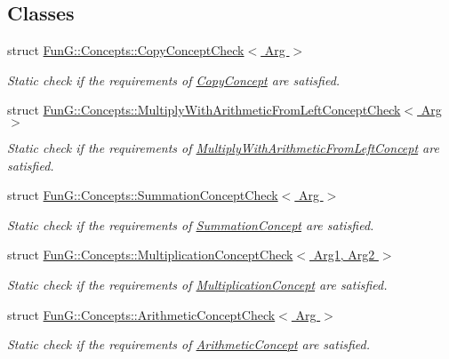 \subsection*{Classes}
\begin{DoxyCompactItemize}
\item 
struct \hyperlink{structFunG_1_1Concepts_1_1CopyConceptCheck}{Fun\+G\+::\+Concepts\+::\+Copy\+Concept\+Check$<$ Arg $>$}
\begin{DoxyCompactList}\small\item\em Static check if the requirements of \hyperlink{structFunG_1_1Concepts_1_1CopyConcept}{Copy\+Concept} are satisfied. \end{DoxyCompactList}\item 
struct \hyperlink{structFunG_1_1Concepts_1_1MultiplyWithArithmeticFromLeftConceptCheck}{Fun\+G\+::\+Concepts\+::\+Multiply\+With\+Arithmetic\+From\+Left\+Concept\+Check$<$ Arg $>$}
\begin{DoxyCompactList}\small\item\em Static check if the requirements of \hyperlink{structFunG_1_1Concepts_1_1MultiplyWithArithmeticFromLeftConcept}{Multiply\+With\+Arithmetic\+From\+Left\+Concept} are satisfied. \end{DoxyCompactList}\item 
struct \hyperlink{structFunG_1_1Concepts_1_1SummationConceptCheck}{Fun\+G\+::\+Concepts\+::\+Summation\+Concept\+Check$<$ Arg $>$}
\begin{DoxyCompactList}\small\item\em Static check if the requirements of \hyperlink{structFunG_1_1Concepts_1_1SummationConcept}{Summation\+Concept} are satisfied. \end{DoxyCompactList}\item 
struct \hyperlink{structFunG_1_1Concepts_1_1MultiplicationConceptCheck}{Fun\+G\+::\+Concepts\+::\+Multiplication\+Concept\+Check$<$ Arg1, Arg2 $>$}
\begin{DoxyCompactList}\small\item\em Static check if the requirements of \hyperlink{structFunG_1_1Concepts_1_1MultiplicationConcept}{Multiplication\+Concept} are satisfied. \end{DoxyCompactList}\item 
struct \hyperlink{structFunG_1_1Concepts_1_1ArithmeticConceptCheck}{Fun\+G\+::\+Concepts\+::\+Arithmetic\+Concept\+Check$<$ Arg $>$}
\begin{DoxyCompactList}\small\item\em Static check if the requirements of \hyperlink{structFunG_1_1Concepts_1_1ArithmeticConcept}{Arithmetic\+Concept} are satisfied. \end{DoxyCompactList}\item 

\end{DoxyCompactItemize}
